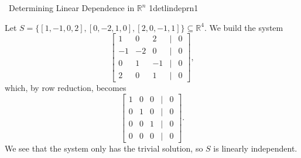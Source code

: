             \begin{example}{\Difficulty\,\Difficulty\,\,Determining Linear Dependence in \(\mathbb{R}^n\) 1}{detlindeprn1}
                
                Let \(S=\{[1,-1,0,2],[0,-2,1,0],[2,0,-1,1]\}\subseteq\mathbb{R}^4\). We build the system
                \begin{equation*}
                    \begin{bmatrix}
                        1 & 0 & 2 & | & 0 \\
                        -1 & -2 & 0 & | & 0 \\
                        0 & 1 & -1 & | & 0 \\
                        2 & 0 & 1 & | & 0
                    \end{bmatrix},
                \end{equation*}
                which, by row reduction, becomes
                \begin{equation*}
                    \begin{bmatrix}
                        1 & 0 & 0 & | & 0 \\
                        0 & 1 & 0 & | & 0 \\
                        0 & 0 & 1 & | & 0 \\
                        0 & 0 & 0 & | & 0
                    \end{bmatrix}.
                \end{equation*}
                We see that the system only has the trivial solution, so \(S\) is linearly independent.

            \end{example}
